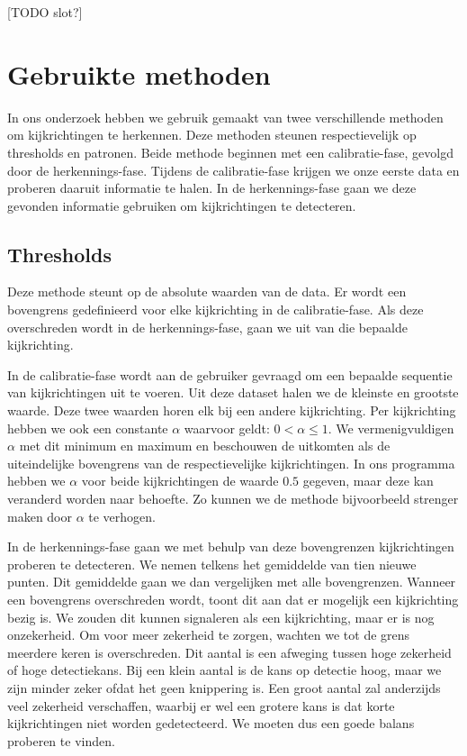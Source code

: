\documentclass{article}
\begin{document}
[TODO slot?]

\section{Gebruikte methoden}

In ons onderzoek hebben we gebruik gemaakt van twee verschillende methoden om kijkrichtingen te herkennen. Deze methoden steunen respectievelijk op thresholds en patronen. Beide methode beginnen met een calibratie-fase, gevolgd door de herkennings-fase. Tijdens de calibratie-fase krijgen we onze eerste data en proberen daaruit informatie te halen. In de herkennings-fase gaan we deze gevonden informatie gebruiken om kijkrichtingen te detecteren.

\subsection{Thresholds}

Deze methode steunt op de absolute waarden van de data. Er wordt een bovengrens gedefinieerd voor elke kijkrichting in de calibratie-fase. Als deze overschreden wordt in de herkennings-fase, gaan we uit van die bepaalde kijkrichting.

In de calibratie-fase wordt aan de gebruiker gevraagd om een bepaalde sequentie van kijkrichtingen uit te voeren. Uit deze dataset halen we de kleinste en grootste waarde. Deze twee waarden horen elk bij een andere kijkrichting. Per kijkrichting hebben we ook een constante $\alpha$ waarvoor geldt: $0 < \alpha \leq 1$. We vermenigvuldigen $\alpha$ met dit minimum en maximum en beschouwen de uitkomten als de uiteindelijke bovengrens van de respectievelijke kijkrichtingen. In ons programma hebben we $\alpha$ voor beide kijkrichtingen de waarde $0.5$ gegeven, maar deze kan veranderd worden naar behoefte. Zo kunnen we de methode bijvoorbeeld strenger maken door $\alpha$ te verhogen.

In de herkennings-fase gaan we met behulp van deze bovengrenzen kijkrichtingen proberen te detecteren. We nemen telkens het gemiddelde van tien nieuwe punten. Dit gemiddelde gaan we dan vergelijken met alle bovengrenzen. Wanneer een bovengrens overschreden wordt, toont dit aan dat er mogelijk een kijkrichting bezig is. We zouden dit kunnen signaleren als een kijkrichting, maar er is nog onzekerheid. Om voor meer zekerheid te zorgen, wachten we tot de grens meerdere keren is overschreden. Dit aantal is een afweging tussen hoge zekerheid of hoge detectiekans. Bij een klein aantal is de kans op detectie hoog, maar we zijn minder zeker ofdat het geen knippering is. Een groot aantal zal anderzijds veel zekerheid verschaffen, waarbij er wel een grotere kans is dat korte kijkrichtingen niet worden gedetecteerd. We moeten dus een goede balans proberen te vinden.
\end{document}
